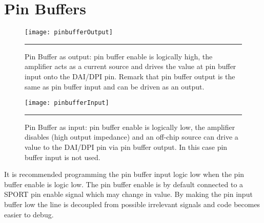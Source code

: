 
\chapter{Pin Buffers} %
\label{AppendixD} %

\begin{figure}[htbp]
\centering
\texttt{[image: pinbufferOutput]}
\rule{30em}{0.5pt}
\caption[Pin buffer Output]{Pin Buffer as output: pin buffer enable is logically high, the amplifier acts as a current source and drives the value at pin buffer input onto the DAI/DPI pin. Remark that pin buffer output is the same as pin buffer input and can be driven as an output.}
\end{figure}
\begin{figure}[htbp]
\centering
\texttt{[image: pinbufferInput]}
\rule{30em}{0.5pt}
\caption[Pin buffer Input]{Pin Buffer as input: pin buffer enable is logically low, the amplifier disables (high output impedance) and an off-chip source can drive a value to the DAI/DPI pin via pin buffer output. In this case pin buffer input is not used.}
\end{figure}
It is recommended programming the pin buffer input logic low when the pin buffer enable is logic low. The pin buffer enable is by default connected to a SPORT pin enable signal which may change in value. By making the pin input buffer low the line is decoupled from possible irrelevant signals and code becomes easier to debug.
